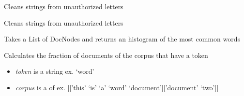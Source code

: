 \documentclass[letterpaper,10pt,english]{sphinxmanual}
\begin{document}

\begin{fulllineitems}
\label{theseus:theseus.processor.theseus.cleanString}
Cleans strings from unauthorized letters

\end{fulllineitems}


\begin{fulllineitems}
\label{theseus:theseus.processor.theseus.cleanStringNoDel}
Cleans strings from unauthorized letters

\end{fulllineitems}


\begin{fulllineitems}
\label{theseus:theseus.processor.theseus.clusterHist}
Takes a List of DocNodes and returns an histogram of the most common words

\end{fulllineitems}


\begin{fulllineitems}
\label{theseus:theseus.processor.theseus.dtf}
Calculates the fraction of documents of the corpus that have a token
\begin{itemize}
\item {} 
\emph{token} is a string               ex. `word'

\item {} 
\emph{corpus} is a  of     ex. {[}{[}'this' `is' `a' `word' `document'{]}{[}'document' `two'{]}{]}

\end{itemize}

\end{fulllineitems}

\end{document}
